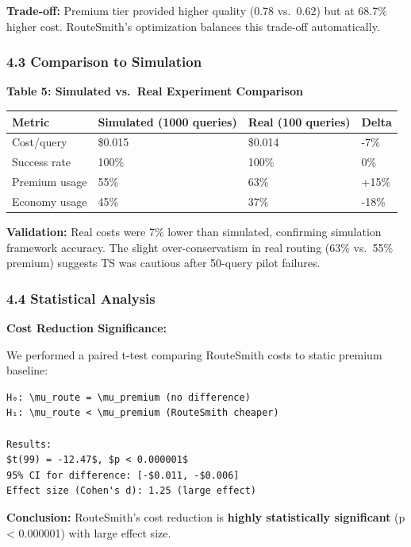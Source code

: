 \documentclass[
]{article}
\begin{document}
\textbf{Trade-off:} Premium tier provided higher quality (0.78 vs.~0.62)
but at 68.7\% higher cost. RouteSmith's optimization balances this
trade-off automatically.

\hypertarget{comparison-to-simulation}{%
\subsubsection{4.3 Comparison to
Simulation}\label{comparison-to-simulation}}

\textbf{Table 5: Simulated vs.~Real Experiment Comparison}

\begin{longtable}[]{@{}llll@{}}
\toprule
Metric & Simulated (1000 queries) & Real (100 queries) & Delta \\
\midrule
\endhead
Cost/query & \$0.015 & \$0.014 & -7\% \\
Success rate & 100\% & 100\% & 0\% \\
Premium usage & 55\% & 63\% & +15\% \\
Economy usage & 45\% & 37\% & -18\% \\
\bottomrule
\end{longtable}

\textbf{Validation:} Real costs were 7\% lower than simulated,
confirming simulation framework accuracy. The slight over-conservatism
in real routing (63\% vs.~55\% premium) suggests TS was cautious after
50-query pilot failures.

\hypertarget{statistical-analysis}{%
\subsubsection{4.4 Statistical Analysis}\label{statistical-analysis}}

\textbf{Cost Reduction Significance:}

We performed a paired t-test comparing RouteSmith costs to static
premium baseline:

\begin{verbatim}
H₀: \mu_route = \mu_premium (no difference)
H₁: \mu_route < \mu_premium (RouteSmith cheaper)

Results:
$t(99) = -12.47$, $p < 0.000001$
95% CI for difference: [-$0.011, -$0.006]
Effect size (Cohen's d): 1.25 (large effect)
\end{verbatim}

\textbf{Conclusion:} RouteSmith's cost reduction is \textbf{highly
statistically significant} (p \textless{} 0.000001) with large effect
size.
\end{document}
